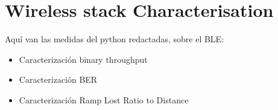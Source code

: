 \section{Wireless stack Characterisation}
Aquí van las medidas del python redactadas, sobre el BLE:
\begin{itemize}
	\item Caracterización binary throughput
	\item Caracterización BER
	\item Caracterización Ramp Lost Ratio to Distance
\end{itemize}






